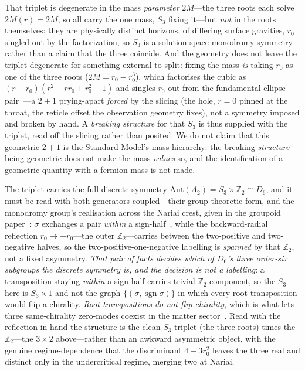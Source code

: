 \documentclass[11pt]{article}
\theoremstyle{plain}
\theoremstyle{remark}
\begin{document}
That triplet is degenerate in the mass \emph{parameter} $2M$---the three roots each solve $2M(r)=2M$, so all carry the one mass, $S_3$ fixing it---but \emph{not} in the roots themselves: they are physically distinct horizons, of differing surface gravities, $r_0$ singled out by the factorization, so $S_3$ is a solution-space monodromy symmetry rather than a claim that the three coincide. And the geometry does not leave the triplet degenerate for something external to split: fixing the mass \emph{is} taking $r_0$ as one of the three roots ($2M=r_0-r_0^3$), which factorises the cubic as $(r-r_0)(r^2+rr_0+r_0^2-1)$ and singles $r_0$ out from the fundamental-ellipse pair~\cite{JanzenSlicing}---a $2{+}1$ prying-apart \emph{forced} by the slicing (the hole, $r=0$ pinned at the throat, the reticle offset the observation geometry fixes), not a symmetry imposed and broken by hand. A \emph{breaking structure} for that $S_3$ is thus supplied with the triplet, read off the slicing rather than posited. We do not claim that this geometric $2{+}1$ is the Standard Model's mass hierarchy: the breaking-\emph{structure} being geometric does not make the mass-\emph{values} so, and the identification of a geometric quantity with a fermion mass is not made.

The triplet carries the full discrete symmetry $\mathrm{Aut}(A_2)=S_3\times\mathbb{Z}_2\cong D_6$, and it must be read with both generators coupled---their group-theoretic form, and the monodromy group's realisation across the Nariai crest, given in the groupoid paper~\cite{JanzenGroupoid}: $\sigma$ exchanges a pair \emph{within} a sign-half~\cite{JanzenSlicing}, while the backward-radial reflection $r_0\mapsto-r_0$---the outer $\mathbb{Z}_2$---carries between the two-positive and two-negative halves, so the two-positive-one-negative labelling is \emph{spanned} by that $\mathbb{Z}_2$, not a fixed asymmetry. \emph{That pair of facts decides which of $D_6$'s three order-six subgroups the discrete symmetry is, and the decision is not a labelling}: a transposition staying \emph{within} a sign-half carries trivial $\mathbb{Z}_2$ component, so the $S_3$ here is $S_3\times1$ and not the graph $\{(\sigma,\operatorname{sgn}\sigma)\}$ in which every root transposition would flip a chirality. \emph{Root transpositions do not flip chirality}, which is what lets three same-chirality zero-modes coexist in the matter sector~\cite{JanzenMatter}. Read with the reflection in hand the structure is the clean $S_3$ triplet (the three roots) times the $\mathbb{Z}_2$---the $3\times2$ above---rather than an awkward asymmetric object, with the genuine regime-dependence that the discriminant $4-3r_0^2$ leaves the three real and distinct only in the undercritical regime, merging two at Nariai.
\end{document}
